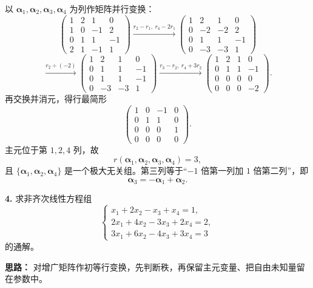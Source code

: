 以 \(\boldsymbol{\alpha}_1,\boldsymbol{\alpha}_2,\boldsymbol{\alpha}_3,\boldsymbol{\alpha}_4\) 为列作矩阵并行变换：
\[
\begin{pmatrix}
1&2&1&0\\
1&0&-1&2\\
0&1&1&-1\\
2&1&-1&1
\end{pmatrix}
\xrightarrow{r_2-r_1,\ r_4-2r_1}
\begin{pmatrix}
1&2&1&0\\
0&-2&-2&2\\
0&1&1&-1\\
0&-3&-3&1
\end{pmatrix}
\]
\[
\xrightarrow{r_2\div(-2)}
\begin{pmatrix}
1&2&1&0\\
0&1&1&-1\\
0&1&1&-1\\
0&-3&-3&1
\end{pmatrix}
\xrightarrow{r_3-r_2,\ r_4+3r_2}
\begin{pmatrix}
1&2&1&0\\
0&1&1&-1\\
0&0&0&0\\
0&0&0&-2
\end{pmatrix}.
\]
再交换并消元，得行最简形
\[
\begin{pmatrix}
1&0&-1&0\\
0&1&1&0\\
0&0&0&1\\
0&0&0&0
\end{pmatrix}.
\]
主元位于第 \(1,2,4\) 列，故
\[
r(\boldsymbol{\alpha}_1,\boldsymbol{\alpha}_2,\boldsymbol{\alpha}_3,\boldsymbol{\alpha}_4)=3,
\]
且 \(\{\boldsymbol{\alpha}_1,\boldsymbol{\alpha}_2,\boldsymbol{\alpha}_4\}\) 是一个极大无关组。第三列等于“\(-1\) 倍第一列加 \(1\) 倍第二列”，即
\[
\boldsymbol{\alpha}_3=-\boldsymbol{\alpha}_1+\boldsymbol{\alpha}_2.
\]
\else \answerarea[8] \fi%

\textbf{4.} 求非齐次线性方程组
\[
\begin{cases}
x_1+2x_2-x_3+x_4=1,\\
2x_1+4x_2-3x_3+2x_4=2,\\
3x_1+6x_2-4x_3+3x_4=3
\end{cases}
\]
的通解。

\ifshowsolutions%
\textbf{思路：} 对增广矩阵作初等行变换，先判断秩，再保留主元变量、把自由未知量留在参数中。

